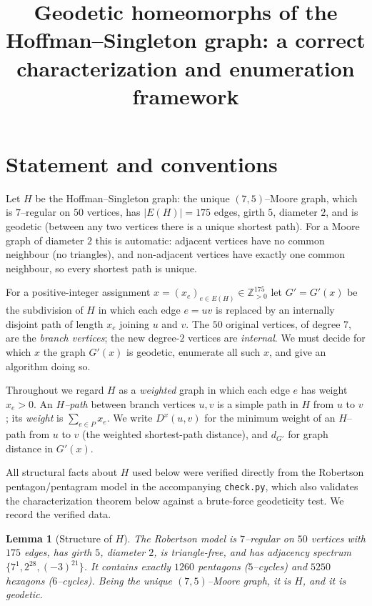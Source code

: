 \documentclass{amsart}
\newtheorem{lemma}{Lemma}
\theoremstyle{definition}
\begin{document}
\title{Geodetic homeomorphs of the Hoffman--Singleton graph:
a correct characterization and enumeration framework}
\maketitle

\section{Statement and conventions}

Let $H$ be the Hoffman--Singleton graph: the unique $(7,5)$--Moore graph, which
is $7$--regular on $50$ vertices, has $|E(H)|=175$ edges, girth $5$, diameter
$2$, and is geodetic (between any two vertices there is a unique shortest path).
For a Moore graph of diameter $2$ this is automatic: adjacent vertices have no
common neighbour (no triangles), and non-adjacent vertices have exactly one
common neighbour, so every shortest path is unique.

For a positive-integer assignment $x=(x_e)_{e\in E(H)}\in\mathbb Z_{>0}^{175}$
let $G'=G'(x)$ be the subdivision of $H$ in which each edge $e=uv$ is replaced
by an internally disjoint path of length $x_e$ joining $u$ and $v$. The $50$
original vertices, of degree $7$, are the \emph{branch vertices}; the new
degree-$2$ vertices are \emph{internal}. We must decide for which $x$ the graph
$G'(x)$ is geodetic, enumerate all such $x$, and give an algorithm doing so.

Throughout we regard $H$ as a \emph{weighted} graph in which each edge $e$ has
weight $x_e>0$. An \emph{$H$--path} between branch vertices $u,v$ is a simple
path in $H$ from $u$ to $v$; its \emph{weight} is $\sum_{e\in P}x_e$. We write
$D^x(u,v)$ for the minimum weight of an $H$--path from $u$ to $v$ (the weighted
shortest-path distance), and $d_{G'}$ for graph distance in $G'(x)$.

All structural facts about $H$ used below were verified directly from the
Robertson pentagon/pentagram model in the accompanying \texttt{check.py}, which
also validates the characterization theorem below against a brute-force
geodeticity test. We record the verified data.

\begin{lemma}[Structure of $H$]\label{lem:struct}
The Robertson model is $7$--regular on $50$ vertices with $175$ edges, has girth
$5$, diameter $2$, is triangle-free, and has adjacency spectrum
$\{7^{1},2^{28},(-3)^{21}\}$. It contains exactly $1260$ pentagons ($5$--cycles)
and $5250$ hexagons ($6$--cycles). Being the unique $(7,5)$--Moore graph, it is
$H$, and it is geodetic.
\end{lemma}
\end{document}

